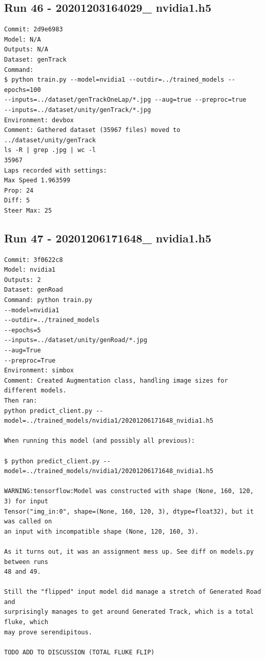 \subsection{Run 46 - 20201203164029\_ nvidia1.h5}
\begin{verbatim}
Commit: 2d9e6983
Model: N/A
Outputs: N/A
Dataset: genTrack
Command: 
$ python train.py --model=nvidia1 --outdir=../trained_models --epochs=100
--inputs=../dataset/genTrackOneLap/*.jpg --aug=true --preproc=true
--inputs=../dataset/unity/genTrack/*.jpg
Environment: devbox
Comment: Gathered dataset (35967 files) moved to ../dataset/unity/genTrack
ls -R | grep .jpg | wc -l
35967
Laps recorded with settings:
Max Speed 1.963599
Prop: 24
Diff: 5
Steer Max: 25
\end{verbatim}

\subsection{Run 47 - 20201206171648\_ nvidia1.h5}
\begin{verbatim}
Commit: 3f0622c8
Model: nvidia1
Outputs: 2
Dataset: genRoad
Command: python train.py
--model=nvidia1
--outdir=../trained_models
--epochs=5
--inputs=../dataset/unity/genRoad/*.jpg
--aug=True
--preproc=True
Environment: simbox
Comment: Created Augmentation class, handling image sizes for different models.
Then ran:
python predict_client.py --model=../trained_models/nvidia1/20201206171648_nvidia1.h5

When running this model (and possibly all previous):

$ python predict_client.py --model=../trained_models/nvidia1/20201206171648_nvidia1.h5

WARNING:tensorflow:Model was constructed with shape (None, 160, 120, 3) for input
Tensor("img_in:0", shape=(None, 160, 120, 3), dtype=float32), but it was called on
an input with incompatible shape (None, 120, 160, 3).

As it turns out, it was an assignment mess up. See diff on models.py between runs 
48 and 49.

Still the "flipped" input model did manage a stretch of Generated Road and
surprisingly manages to get around Generated Track, which is a total fluke, which
may prove serendipitous.

TODO ADD TO DISCUSSION (TOTAL FLUKE FLIP)
\end{verbatim}


